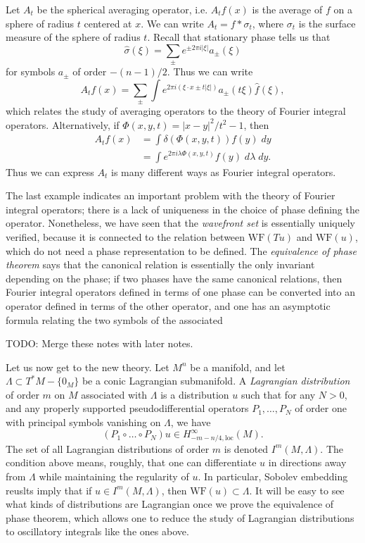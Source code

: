 \begin{example}
    Let $A_t$ be the spherical averaging operator, i.e. $A_t f(x)$ is the average of $f$ on a sphere of radius $t$ centered at $x$. We can write $A_t = f * \sigma_t$, where $\sigma_t$ is the surface measure of the sphere of radius $t$. Recall that stationary phase tells us that
    \[ \widehat{\sigma}(\xi) = \sum_{\pm} e^{\pm 2 \pi i |\xi|} a_{\pm}(\xi) \]
    for symbols $a_{\pm}$ of order $-(n-1)/2$. Thus we can write
    \[ A_t f(x) = \sum_{\pm} \int e^{2 \pi i(\xi \cdot x \pm t |\xi|)} a_{\pm}(t \xi) \widehat{f}(\xi), \]
    which relates the study of averaging operators to the theory of Fourier integral operators. Alternatively, if $\Phi(x,y,t) = |x - y|^2 / t^2 - 1$, then
    \begin{align*}
        A_t f(x) &= \int \delta(\Phi(x,y,t)) f(y)\; dy\\
        &= \int e^{2 \pi i \lambda \Phi(x,y,t)} f(y)\; d\lambda\; dy.
    \end{align*}
    Thus we can express $A_t$ is many different ways as Fourier integral operators.
\end{example}

The last example indicates an important problem with the theory of Fourier integral operators; there is a lack of uniqueness in the choice of phase defining the operator. Nonetheless, we have seen that the \emph{wavefront set} is essentially uniquely verified, because it is connected to the relation between $\text{WF}(Tu)$ and $\text{WF}(u)$, which do not need a phase representation to be defined. The \emph{equivalence of phase theorem} says that the canonical relation is essentially the only invariant depending on the phase; if two phases have the same canonical relations, then Fourier integral operators defined in terms of one phase can be converted into an operator defined in terms of the other operator, and one has an asymptotic formula relating the two symbols of the associated

TODO: Merge these notes with later notes.






Let us now get to the new theory. Let $M^n$ be a manifold, and let $\Lambda \subset T^* M - \{ 0_M \}$ be a conic Lagrangian submanifold. A \emph{Lagrangian distribution} of order $m$ on $M$ associated with $\Lambda$ is a distribution $u$ such that for any $N > 0$, and any properly supported pseudodifferential operators $P_1,\dots,P_N$ of order one with principal symbols vanishing on $\Lambda$, we have
%
\[ (P_1 \circ \dots \circ P_N) u \in H^\infty_{-m-n/4, \text{loc}}(M). \]
%
The set of all Lagrangian distributions of order $m$ is denoted $I^m(M,\Lambda)$. The condition above means, roughly, that one can differentiate $u$ in directions away from $\Lambda$ while maintaining the regularity of $u$. In particular, Sobolev embedding reuslts imply that if $u \in I^m(M,\Lambda)$, then $\text{WF}(u) \subset \Lambda$. It will be easy to see what kinds of distributions are Lagrangian once we prove the equivalence of phase theorem, which allows one to reduce the study of Lagrangian distributions to oscillatory integrals like the ones above.

